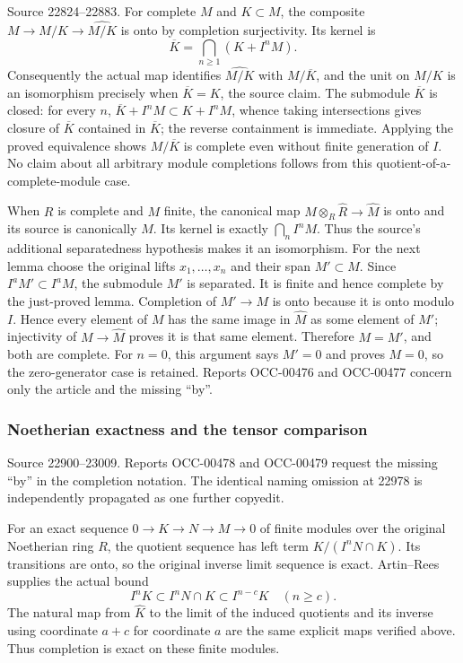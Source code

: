 Source 22824--22883. For complete \(M\) and \(K\subset M\), the composite \(M\to M/K\to\widehat{M/K}\) is onto by completion surjectivity. Its kernel is \[
\overline K=\bigcap_{n\geq1}(K+I^nM).
\] Consequently the actual map identifies \(\widehat{M/K}\) with \(M/\overline K\), and the unit on \(M/K\) is an isomorphism precisely when \(\overline K=K\), the source claim. The submodule \(\overline K\) is closed: for every \(n\), \(\overline K+I^nM\subset K+I^nM\), whence taking intersections gives closure of \(\overline K\) contained in \(\overline K\); the reverse containment is immediate. Applying the proved equivalence shows \(M/\overline K\) is complete even without finite generation of \(I\). No claim about all arbitrary module completions follows from this quotient-of-a-complete-module case.

When \(R\) is complete and \(M\) finite, the canonical map \(M\otimes_R\widehat R\to\widehat M\) is onto and its source is canonically \(M\). Its kernel is exactly \(\bigcap_n I^nM\). Thus the source's additional separatedness hypothesis makes it an isomorphism. For the next lemma choose the original lifts \(x_1,\ldots,x_n\) and their span \(M'\subset M\). Since \(I^aM'\subset I^aM\), the submodule \(M'\) is separated. It is finite and hence complete by the just-proved lemma. Completion of \(M'\to M\) is onto because it is onto modulo \(I\). Hence every element of \(M\) has the same image in \(\widehat M\) as some element of \(M'\); injectivity of \(M\to\widehat M\) proves it is that same element. Therefore \(M=M'\), and both are complete. For \(n=0\), this argument says \(M'=0\) and proves \(M=0\), so the zero-generator case is retained. Reports OCC-00476 and OCC-00477 concern only the article and the missing ``by''.

\subsubsection{Noetherian exactness and the tensor comparison}\label{algebra-proof-014-noetherian-exactness-and-the-tensor-comparison}

Source 22900--23009. Reports OCC-00478 and OCC-00479 request the missing ``by'' in the completion notation. The identical naming omission at 22978 is independently propagated as one further copyedit.

For an exact sequence \(0\to K\to N\to M\to0\) of finite modules over the original Noetherian ring \(R\), the quotient sequence has left term \(K/(I^nN\cap K)\). Its transitions are onto, so the original inverse limit sequence is exact. Artin--Rees supplies the actual bound \[
I^nK\subset I^nN\cap K\subset I^{n-c}K\quad(n\geq c).
\] The natural map from \(\widehat K\) to the limit of the induced quotients and its inverse using coordinate \(a+c\) for coordinate \(a\) are the same explicit maps verified above. Thus completion is exact on these finite modules.

